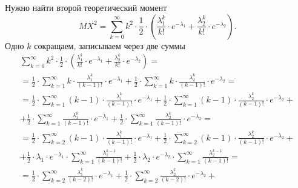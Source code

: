 Нужно найти второй теоретический момент
$$MX^2 =
  \sum \limits_{k = 0}^{ \infty }
    k^2 \cdot \frac{1}{2} \cdot
    \left(
      \frac{ \lambda_1^k}{k!} \cdot e^{- \lambda_1} + \frac{ \lambda_2^k}{k!} \cdot e^{- \lambda_2}
    \right).$$
Одно $k$ сокращаем, записываем через две суммы
\begin{equation*}
  \begin{split}
    \sum \limits_{k = 0}^{ \infty }
      k^2 \cdot \frac{1}{2} \cdot
      \left(
        \frac{ \lambda_1^k}{k!} \cdot e^{- \lambda_1} +
        \frac{ \lambda_2^k}{k!} \cdot e^{- \lambda_2}
      \right) = \\
    = \frac{1}{2} \cdot
    \sum \limits_{k = 1}^{ \infty }
      k \cdot \frac{ \lambda_1^k}{ \left( k - 1 \right)!} \cdot e^{- \lambda_1 } +
    \frac{1}{2} \cdot
    \sum \limits_{k = 1}^{ \infty }
      k \cdot \frac{ \lambda_2^k}{ \left( k -1 \right)!} \cdot e^{- \lambda_2} = \\
    = \frac{1}{2} \cdot
    \sum \limits_{k = 1}^{ \infty }
      \left( k - 1 \right) \cdot \frac{ \lambda_1^k}{ \left( k - 1 \right)!} \cdot e^{- \lambda_1} +
    \frac{1}{2} \cdot
    \sum \limits_{k = 1}^{ \infty }
      \left( k - 1 \right) \cdot \frac{ \lambda_2^k}{ \left( k - 1 \right)!} \cdot
      e^{- \lambda_2} + \\
    + \frac{1}{2} \cdot
    \sum \limits_{k = 1}^{ \infty }
      \frac{ \lambda_1^k}{ \left( k - 1 \right)!} \cdot e^{- \lambda_1} +
    \frac{1}{2} \cdot
    \sum \limits_{k = 1}^{ \infty }
      \frac{ \lambda_2^k}{ \left( k - 1 \right)!} \cdot e^{- \lambda_2} = \\
    = \frac{1}{2} \cdot
    \sum \limits_{k = 2}^{ \infty }
      \left( k - 1 \right) \cdot \frac{ \lambda_1^k}{ \left( k - 1 \right)!} \cdot e^{- \lambda_1} +
    \frac{1}{2} \cdot
    \sum \limits_{k = 2}^{ \infty }
      \left( k - 1 \right) \cdot \frac{ \lambda_2^k}{ \left( k - 1 \right)!} \cdot
      e^{- \lambda_2} + \\
    + \frac{1}{2} \cdot \lambda_1 \cdot e^{- \lambda_1} \cdot
    \sum \limits_{k = 1}^{ \infty } \frac{ \lambda_1^{k - 1}}{ \left( k - 1 \right)!} +
    \frac{1}{2} \cdot \lambda_2 \cdot e^{- \lambda_2} \cdot
    \sum \limits_{k = 1}^{ \infty } \frac{ \lambda_2^{k - 1}}{ \left( k - 1 \right)!} = \\
    = \frac{1}{2} \cdot
    \sum \limits_{k = 2}^{ \infty }
      \frac{ \lambda_1^k}{ \left( k - 2 \right)!} \cdot e^{- \lambda_1} +
    \frac{1}{2} \cdot
    \sum \limits_{k = 2}^{ \infty }
      \frac{ \lambda_2^k}{ \left( k - 2 \right)!} \cdot e^{- \lambda_2} +

\end{split}
\end{equation*}
